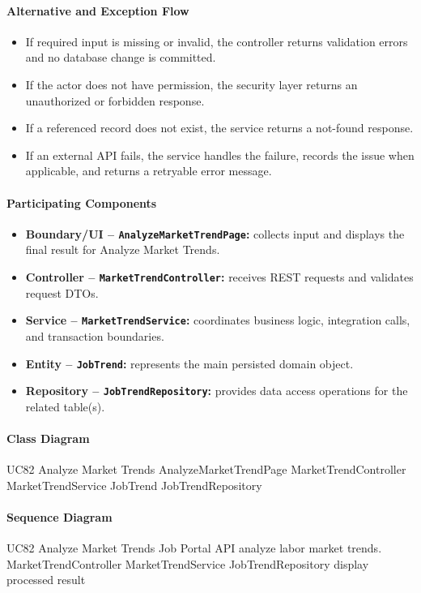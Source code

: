 \paragraph{Alternative and Exception Flow}

\begin{itemize}
    \item If required input is missing or invalid, the controller returns validation errors and no database change is committed.
    \item If the actor does not have permission, the security layer returns an unauthorized or forbidden response.
    \item If a referenced record does not exist, the service returns a not-found response.
    \item If an external API fails, the service handles the failure, records the issue when applicable, and returns a retryable error message.
\end{itemize}

\paragraph{Participating Components}

\begin{itemize}
    \item \textbf{Boundary/UI -- \texttt{AnalyzeMarketTrendPage}:} collects input and displays the final result for Analyze Market Trends.
    \item \textbf{Controller -- \texttt{MarketTrendController}:} receives REST requests and validates request DTOs.
    \item \textbf{Service -- \texttt{MarketTrendService}:} coordinates business logic, integration calls, and transaction boundaries.
    \item \textbf{Entity -- \texttt{JobTrend}:} represents the main persisted domain object.
    \item \textbf{Repository -- \texttt{JobTrendRepository}:} provides data access operations for the related table(s).
\end{itemize}

\paragraph{Class Diagram}

\ClassDiagram
{UC82 Analyze Market Trends}
{AnalyzeMarketTrendPage}
{MarketTrendController}
{MarketTrendService}
{JobTrend}
{JobTrendRepository}

\paragraph{Sequence Diagram}

\SequenceDiagram
{UC82 Analyze Market Trends}
{Job Portal API}
{analyze labor market trends.}
{MarketTrendController}
{MarketTrendService}
{JobTrendRepository}
{display processed result}
